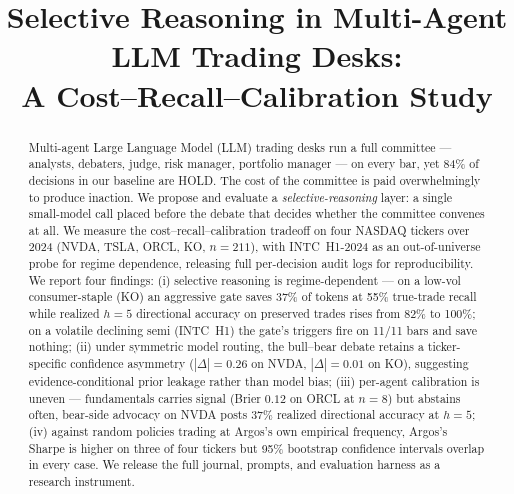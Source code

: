 \documentclass[conference]{IEEEtran}
\begin{document}
\title{Selective Reasoning in Multi-Agent LLM Trading Desks:\\
A Cost--Recall--Calibration Study}

\author{
}

\maketitle

\begin{abstract}
Multi-agent Large Language Model (LLM) trading desks run a full
committee --- analysts, debaters, judge, risk manager, portfolio
manager --- on every bar, yet 84\% of decisions in our baseline are
HOLD. The cost of the committee is paid overwhelmingly to produce
inaction. We propose and evaluate a \emph{selective-reasoning} layer:
a single small-model call placed before the debate that decides
whether the committee convenes at all. We measure the
cost--recall--calibration tradeoff on four NASDAQ tickers over 2024
(NVDA, TSLA, ORCL, KO, $n{=}211$), with INTC~H1-2024 as an
out-of-universe probe for regime dependence, releasing full
per-decision audit logs for reproducibility. We report four findings:
(i) selective reasoning is regime-dependent --- on a low-vol
consumer-staple (KO) an aggressive gate saves 37\% of tokens at 55\%
true-trade recall while realized $h{=}5$ directional accuracy on
preserved trades rises from 82\% to 100\%; on a volatile declining
semi (INTC~H1) the gate's triggers fire on 11/11 bars and save
nothing; (ii) under symmetric model routing, the bull--bear debate
retains a ticker-specific confidence asymmetry ($|\Delta|{=}0.26$ on
NVDA, $|\Delta|{=}0.01$ on KO), suggesting evidence-conditional prior
leakage rather than model bias; (iii) per-agent calibration is uneven
--- fundamentals carries signal (Brier $0.12$ on ORCL at $n{=}8$)
but abstains often, bear-side advocacy on NVDA posts $37\%$ realized
directional accuracy at $h{=}5$; (iv) against random policies trading
at Argos's own empirical frequency, Argos's Sharpe is higher on
three of four tickers but 95\% bootstrap confidence intervals overlap
in every case. We release the full journal, prompts, and evaluation
harness as a research instrument.
\end{abstract}
\end{document}
